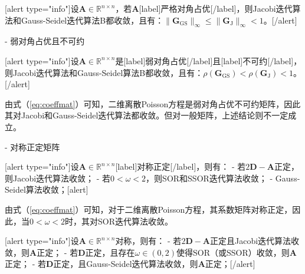 \documentclass[12pt, UTF8, nofonts]{ctexart}
\begin{document}
[alert type="info"]设$\boldsymbol{A}\in\mathbb{R}^{n \times n}$，若$\boldsymbol{A}$[label]严格对角占优[/label]，则Jacobi迭代算法和Gauss-Seidel迭代算法B都收敛，且有：$\|\boldsymbol{G}_{\mathrm{GS}}\|_\infty\leq\|\boldsymbol{G}_{\mathrm{J}}\|_\infty<1$。[/alert]

- 弱对角占优且不可约

[alert type="info"]设$\boldsymbol{A}\in\mathbb{R}^{n \times n}$是[label]弱对角占优[/label]且[label]不可约[/label]，则Jacobi迭代算法和Gauss-Seidel算法B都收敛，且有：$\rho(\boldsymbol{G}_{\mathrm{GS}})<\rho(\boldsymbol{G}_{\mathrm{J}})<1$。[/alert]

由式（\ref{eq:coeffmat}）可知，二维离散Poisson方程是弱对角占优不可约矩阵，因此其对Jacobi和Gauss-Seidel迭代算法都收敛。但对一般矩阵，上述结论则不一定成立。

- 对称正定矩阵

[alert type="info"]设$\boldsymbol{A}\in\mathbb{R}^{n \times n}$[label]对称正定[/label]，则有：
- 若$2\boldsymbol{D}-\boldsymbol{A}$正定，则Jacobi迭代算法收敛；
- 若$0 < \omega < 2$，则SOR和SSOR迭代算法收敛；
- Gauss-Seidel算法收敛；[alert]

由式（\ref{eq:coeffmat}）可知，对于二维离散Poisson方程，其系数矩阵对称正定，因此，当$0 < \omega < 2$时，其对SOR迭代算法收敛。

[alert type="info"]设$\boldsymbol{A}\in\mathbb{R}^{n \times n}$对称，则有：
- 若$2\boldsymbol{D}-\boldsymbol{A}$正定且Jacobi迭代算法收敛，则$\boldsymbol{A}$正定；
- 若$\boldsymbol{D}$正定，且存在$\omega\in(0,2)$使得SOR（或SSOR）收敛，则$\boldsymbol{A}$正定；
- 若$\boldsymbol{D}$正定，且Gauss-Seidel迭代算法收敛，则$\boldsymbol{A}$正定；[/alert]

\end{document}
